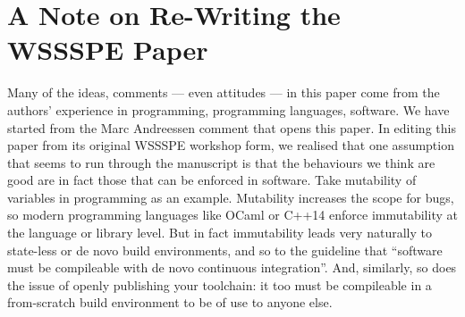 \documentclass[a4paper,11pt]{article}
\begin{document}
\section*{A Note on Re-Writing the WSSSPE Paper}

Many of the ideas, comments --- even attitudes --- in this paper come
from the authors' experience in programming, programming languages,
software. We have started from the Marc Andreessen comment that opens
this paper. In editing this paper from its original WSSSPE workshop
form, we realised that one assumption that seems to run through the
manuscript is that the behaviours we think are good are in fact those
that can be enforced in software.  Take mutability of variables in
programming as an example. Mutability increases the scope for bugs, so
modern programming languages like OCaml or C++14 enforce immutability
at the language or library level. But in fact immutability leads very
naturally to state-less or de novo build environments, and so to the
guideline that ``software must be compileable with de novo continuous
integration''.  And, similarly, so does the issue of openly publishing
your toolchain: it too must be compileable in a from-scratch build
environment to be of use to anyone else.




\end{document}
